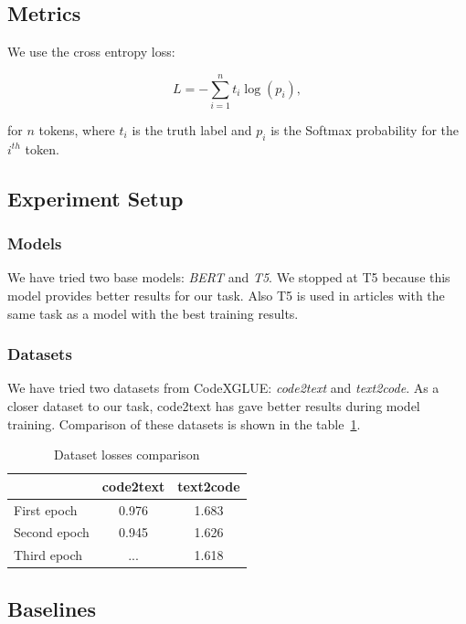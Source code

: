 \documentclass{article}
\begin{document}
\subsection{Metrics}

We use the cross entropy loss:

$$L = - \sum_{i=1}^n t_i \log{(p_i)},$$

for $n$ tokens, where $t_i$ is the truth label and $p_i$ is the Softmax probability for the $i^{th}$ token.

\subsection{Experiment Setup}

\subsubsection{Models}

We have tried two base models: \textit{BERT} and \textit{T5}. We stopped at T5 because this model provides better results for our task. Also T5 is used in articles with the same task as a model with the best training results.

\subsubsection{Datasets}

We have tried two datasets from CodeXGLUE: \textit{code2text} and \textit{text2code}. As a closer dataset to our task, code2text has gave better results during model training. Comparison of these datasets is shown in the {table}~\ref{tab:datasetscomparison}.

\begin{table}[tbh!]
\begin{center}
\begin{tabular}[t]{|l|cc|}
\hline
 & code2text & text2code \\
\hline
First epoch & 0.976 & 1.683 \\
Second epoch & 0.945 & 1.626 \\
Third epoch & ... & 1.618 \\
\hline
\end{tabular}
\caption{Dataset losses comparison}
\label{tab:datasetscomparison}
\end{center}
\end{table}

\subsection{Baselines}
\end{document}
